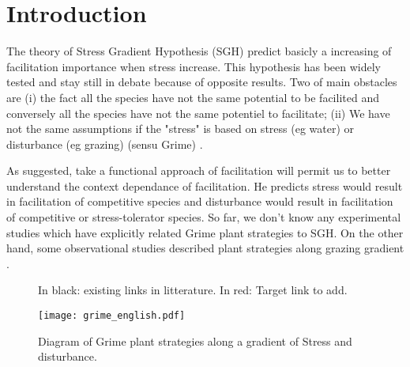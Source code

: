 \documentclass[12pt]{article} %
\begin{document}
\section{Introduction}
The theory of Stress Gradient Hypothesis (SGH) predict basicly a increasing of facilitation importance when stress increase. This hypothesis has been widely tested and stay still in debate because of opposite results. Two of main obstacles are (i) the fact all the species have not the same potential to be facilited and conversely all the species have not the same potentiel to facilitate; (ii) We have not the same assumptions if the "stress" is based on stress (eg water) or disturbance (eg grazing) (sensu Grime) \citep{Maestre2009}. 

As \citet{Butterfield2013} suggested, take a functional approach of facilitation will permit us to better understand the context dependance of facilitation. He predicts stress would result in facilitation of competitive species and disturbance would result in facilitation of competitive or stress-tolerator species. So far, we don't know any experimental studies which have explicitly related Grime plant strategies to SGH. On the other hand, some observational studies described plant strategies along grazing gradient \citep{DIAZ2007}. 

\begin{figure}
\begin{center}
\end{center}
\caption{In black: existing links in litterature. In red: Target link to add.}
\end{figure}


\begin{figure}
\begin{center}
\texttt{[image: grime\_english.pdf]}
\end{center}
\caption{Diagram of Grime plant strategies along a gradient of Stress and disturbance.\label{Grime}}
\end{figure}
\end{document}
